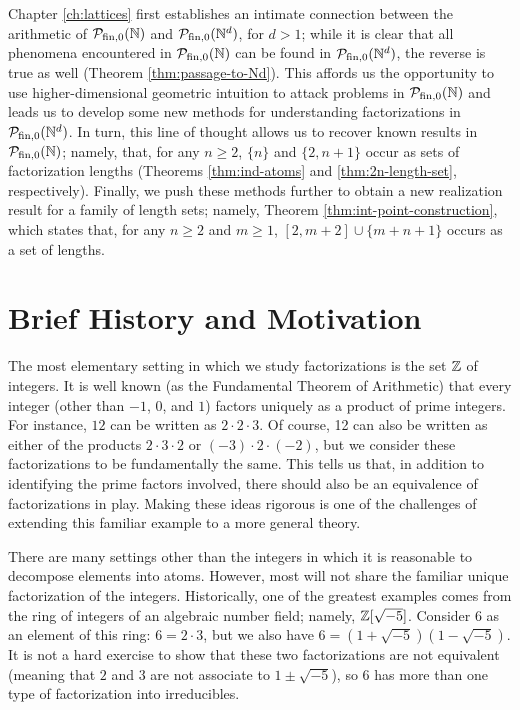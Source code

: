 Chapter \ref{ch:lattices} first establishes an intimate connection between the arithmetic of ${\mathcal{P}_{\textrm{fin},0}(\mathbb{N})}$ and $\mathcal{P}_{\textrm{fin}, 0}(\mathbb{N}^d)$, for $d>1$; 
while it is clear that all phenomena encountered in ${\mathcal{P}_{\textrm{fin},0}(\mathbb{N})}$ can be found in $\mathcal{P}_{\textrm{fin}, 0}(\mathbb{N}^d)$, the reverse is true as well (Theorem \ref{thm:passage-to-Nd}).  
This affords us the opportunity to use higher-dimensional geometric intuition to attack problems in ${\mathcal{P}_{\textrm{fin},0}(\mathbb{N})}$ and leads us to develop some new methods for understanding factorizations in $\mathcal{P}_{\textrm{fin}, 0}(\mathbb{N}^d)$.
In turn, this line of thought allows us to recover known results in ${\mathcal{P}_{\textrm{fin},0}(\mathbb{N})}$; namely, that, for any $n\ge 2$, $\{n\}$ and $\{2,n+1\}$ occur as sets of factorization lengths (Theorems \ref{thm:ind-atoms} and \ref{thm:2n-length-set}, respectively).
Finally, we push these methods further to obtain a new realization result for a family of length sets; namely, Theorem \ref{thm:int-point-construction}, which states that, for any $n\ge 2$ and $m\ge 1$, $[ 2,m+2 ] \cup \{m+n+1\}$ occurs as a set of lengths.

\section{Brief History and Motivation}

The most elementary setting in which we study factorizations is the set $\mathbb{Z}$ of integers.
It is well known (as the Fundamental Theorem of Arithmetic) that every integer (other than $-1$, $0$, and $1$) factors uniquely as a product of prime integers.
For instance, $12$ can be written as $2\cdot 2\cdot 3$.
Of course, 12 can also be written as either of the products $2\cdot 3\cdot 2$ or $(-3)\cdot 2\cdot (-2)$, but we consider these factorizations to be fundamentally the same.  
This tells us that, in addition to identifying the prime factors involved, there should also be an equivalence of factorizations in play.
Making these ideas rigorous is one of the challenges of extending this familiar example to a more general theory.


There are many settings other than the integers in which it is reasonable to decompose elements into atoms. 
However, most will not share the familiar unique factorization of the integers.  
Historically, one of the greatest examples comes from the ring of integers of an algebraic number field; namely, $\mathbb{Z}[\sqrt{-5}]$.
Consider $6$ as an element of this ring: $6=2\cdot3$, but we also have $6 = (1+\sqrt{-5})(1-\sqrt{-5})$.
It is not a hard exercise to show that these two factorizations are not equivalent (meaning that $2$ and $3$ are not associate to $1\pm\sqrt{-5}$), so $6$ has more than one type of factorization into irreducibles.

